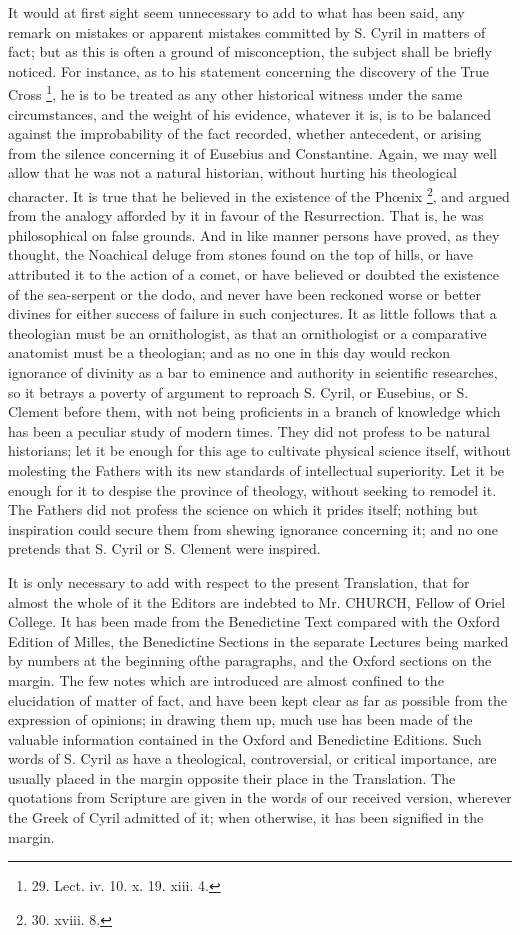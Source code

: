 It would at first sight seem
unnecessary to add to what has been said, any remark on mistakes or
apparent mistakes committed by S. Cyril in matters of fact; but as
this is often a ground of misconception, the subject shall be briefly
noticed. For instance, as to his statement concerning the discovery of
the True Cross \footnote{29. Lect.
iv. 10. x. 19. xiii. 4.}, he is
to be treated as any other historical witness under the same
circumstances, and the weight of his evidence, whatever it is, is to
be balanced against the improbability of the fact recorded, whether
antecedent, or arising from the silence concerning it of Eusebius and
Constantine. Again, we may well allow that he was not a natural
historian, without hurting his theological character. It is true that
he believed in the existence of the Phœnix \footnote{30. xviii.
8.}, and argued from the analogy afforded by it in favour of the
Resurrection. That is, he was philosophical on false grounds. And in
like manner persons have proved, as they thought, the Noachical deluge
from stones found on the top of hills, or have attributed it to the
action of a comet, or have believed or doubted the existence of
the sea-serpent or the dodo, and never have been reckoned worse or
better divines for either success of failure in such conjectures. It
as little follows that a theologian must be an ornithologist, as that
an ornithologist or a comparative anatomist must be a theologian; and
as no one in this day would reckon ignorance of divinity as a bar to
eminence and authority in scientific researches, so it betrays a
poverty of argument to reproach S. Cyril, or Eusebius, or S. Clement
before them, with not being proficients in a branch of knowledge which
has been a peculiar study of modern times. They did not profess to be
natural historians; let it be enough for this age to cultivate
physical science itself, without molesting the Fathers with its new
standards of intellectual superiority. Let it be enough for it to
despise the province of theology, without seeking to remodel it. The
Fathers did not profess the science on which it prides itself; nothing
but inspiration could secure them from shewing ignorance concerning
it; and no one pretends that S. Cyril or S. Clement were inspired.

It is only necessary to add
with respect to the present Translation, that for almost the whole of
it the Editors are indebted to Mr. CHURCH, Fellow of Oriel College. It has been
made from the Benedictine Text compared with the Oxford Edition of
Milles, the Benedictine Sections in the separate Lectures being marked
by numbers at the beginning of\emph{}the paragraphs, and the Oxford
sections on the margin. The few notes which are introduced are almost
confined to the elucidation of matter of fact, and have been kept
clear as far as possible from the expression of opinions; in drawing
them up, much use has been made of the valuable information contained
in the Oxford and Benedictine Editions. Such words of S. Cyril as have
a theological, controversial, or critical importance, are usually
placed in the margin opposite their place in the Translation.
The quotations from Scripture are given in the words of our received
version, wherever the Greek of Cyril admitted of it; when otherwise,
it has been signified in the margin.

